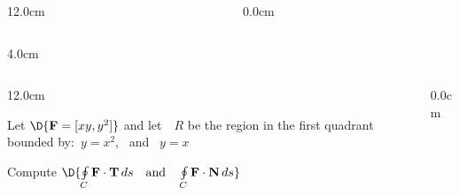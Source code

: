 \begin{frame}
\begin{columns}
\begin{column}{12.0cm}
\begin{columns}
\begin{column}{4.0cm}
	
\end{column}
\end{columns}

\vspace{7.2cm}

\end{column}\begin{column}{0.0cm}\end{column}\end{columns}
\end{frame}

\begin{frame}
\begin{columns}\begin{column}{12.0cm}

\scriptsize

\EX Let $\D{{\bf F} = [xy, y^2]}$ and let \,\, $R$ be the region in the first quadrant bounded by:\, $y=x^2$, \, and \, $y=x$

\vspace{0.2cm}

Compute \quad $\D{\oint \limits_{C} {\bf F} \cdot {\bf T}\, ds \quad \text{and} \quad \oint \limits_{C} {\bf F} \cdot {\bf N}\, ds}$

\vspace{0.2cm}

\vspace{7.2cm}

\end{column}\begin{column}{0.0cm}\end{column}\end{columns}
\end{frame}

